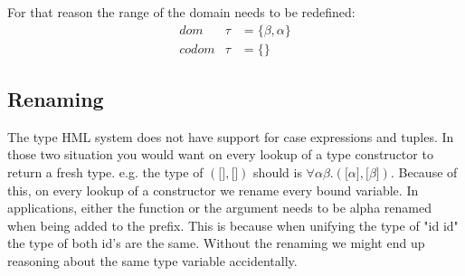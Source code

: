 For that reason the range of the domain needs to be redefined:
\begin{eqnarray*}
dom   &\tau& = \{\beta, \alpha\}\\
codom &\tau& = \{\}
\end{eqnarray*}

\subsection{Renaming}
\label{renaming}

The type HML system does not have support for case expressions and tuples. In those two situation you would want on every lookup of a type constructor to return a fresh type. e.g. the type of $(\lbrack \rbrack, \lbrack \rbrack)$ should is $\forall \alpha \beta . (\lbrack \alpha \rbrack, \lbrack \beta \rbrack)$. Because of this, on every lookup of a constructor we rename every bound variable. In applications, either the function or the argument needs to be alpha renamed when being added to the prefix. This is because when unifying the type of "id id" the type of both id's are the same. Without the renaming we might end up reasoning about the same type variable accidentally.
